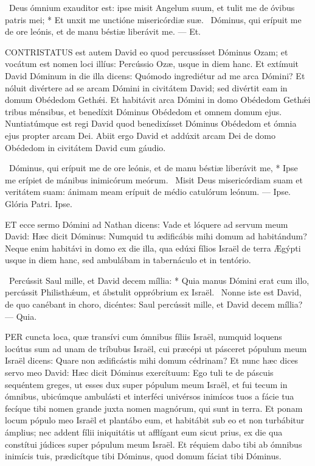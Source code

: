 \R\ Deus ómnium exauditor est: ipse misit Angelum suum, et tulit me de óvibus patris mei; * Et unxit me unctióne misericórdiæ suæ. \V\ Dóminus, qui erípuit me de ore leónis, et de manu béstiæ liberávit me. --- Et.



\lettrine[lines=2]{C}{ONTRISTATUS} est autem David eo quod percussísset Dóminus Ozam; et vocátum est nomen loci illíus: Percússio Ozæ, usque in diem hanc. Et extímuit David Dóminum in die illa dicens: Quómodo ingrediétur ad me arca Dómini? Et nóluit divértere ad se arcam Dómini in civitátem David; sed divértit eam in domum Obédedom Gethǽi. Et habitávit arca Dómini in domo Obédedom Gethǽi tribus ménsibus, et benedíxit Dóminus Obédedom et omnem domum ejus. Nuntiatúmque est regi David quod benedixísset Dóminus Obédedom et ómnia ejus propter arcam Dei. Abiit ergo David et addúxit arcam Dei de domo Obédedom in civitátem David cum gáudio.

\R\ Dóminus, qui erípuit me de ore leónis, et de manu béstiæ liberávit me, * Ipse me erípiet de mánibus inimicórum meórum. \V\ Misit Deus misericórdiam suam et veritátem suam: ánimam meam erípuit de médio catulórum leónum. --- Ipse. Glória Patri. Ipse.




\lettrine[lines=2]{E}{T} ecce sermo Dómini ad Nathan dicens: Vade et lóquere ad servum meum David: Hæc dicit Dóminus: Numquid tu ædificábis mihi domum ad habitándum? Neque enim habitávi in domo ex die illa, qua edúxi fílios Israël de terra Ægýpti usque in diem hanc, sed ambulábam in tabernáculo et in tentório.

\R\ Percússit Saul mille, et David decem míllia: * Quia manus Dómini erat cum illo, percússit Philisthǽum, et ábstulit oppróbrium ex Israël. \V\ Nonne iste est David, de quo canébant in choro, dicéntes: Saul percússit mille, et David decem míllia? --- Quia.


\lettrine[lines=2]{P}{ER} cuncta loca, quæ transívi cum ómnibus fíliis Israël, numquid loquens locútus sum ad unam de tríbubus Israël, cui præcépi ut pásceret pópulum meum Israël dicens: Quare non ædificástis mihi domum cédrinam? Et nunc hæc dices servo meo David: Hæc dicit Dóminus exercítuum: Ego tuli te de páscuis sequéntem greges, ut esses dux super pópulum meum Israël, et fui tecum in ómnibus, ubicúmque ambulásti et interféci univérsos inimícos tuos a fácie tua fecíque tibi nomen grande juxta nomen magnórum, qui sunt in terra. Et ponam locum pópulo meo Israël et plantábo eum, et habitábit sub eo et non turbábitur ámplius; nec addent fílii iniquitátis ut afflígant eum sicut prius, ex die qua constítui júdices super pópulum meum Israël. Et réquiem dabo tibi ab ómnibus inimícis tuis, prædicítque tibi Dóminus, quod domum fáciat tibi Dóminus.

